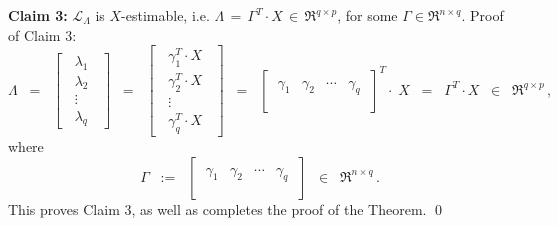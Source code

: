 \vskip 0.5cm
\noindent
\textbf{Claim 3:}\quad
$\mathcal{L}_{\Lambda}$ is $X$-estimable, 
i.e. $\Lambda \,=\, \Gamma^{T} \cdot X \,\in\, \Re^{q \times p}$, for some $\Gamma \in \Re^{n \times q}$.
\vskip 0.2cm
\noindent
Proof of Claim 3:\quad
\begin{equation*}
\Lambda
\;\; = \;\;
	\left[\;\;\begin{array}{c}
	\lambda_{1} \\ \lambda_{2} \\ \vdots \\ \lambda_{q}
	\end{array}\;\;\right]
\;\; = \;\;
	\left[\;\;\begin{array}{c}
	\gamma_{1}^{T} \cdot X \\ \gamma_{2}^{T} \cdot X \\ \vdots \\ \gamma_{q}^{T} \cdot X
	\end{array}\;\;\right]
\;\; = \;\;
	\left[\;\begin{array}{cccc}
	\\
	\gamma_{1} & \gamma_{2} & \cdots & \gamma_{q}
	\\ \\
	\end{array}\;\right]^{T}
	\cdot \; X
\;\; = \;\;
	\Gamma^{T} \cdot X
\;\; \in\;\;
	\Re^{q \times p}\,,
\end{equation*}
where
\begin{equation*}
\Gamma
\;\; := \;\;
	\left[\;\begin{array}{cccc}
	\\
	\gamma_{1} & \gamma_{2} & \cdots & \gamma_{q}
	\\ \\
	\end{array}\;\right]
\;\; \in\;\;
	\Re^{n \times q}\,.
\end{equation*}
This proves Claim 3, as well as completes the proof of the Theorem. \qed

